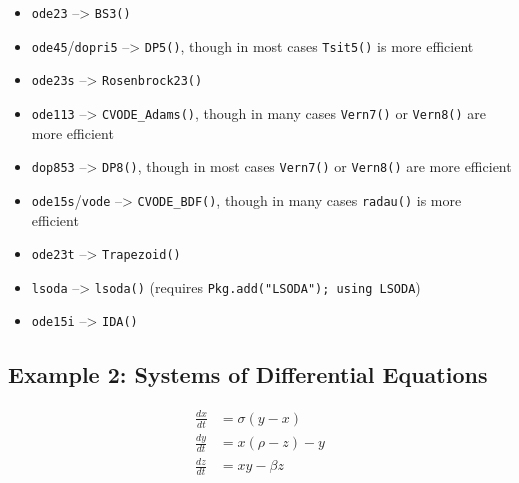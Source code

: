 \documentclass[11pt]{article}
\begin{document}
\begin{itemize}
\itemsep1pt\parskip0pt
\item
  \texttt{ode23} --\textgreater{} \texttt{BS3()}
\item
  \texttt{ode45}/\texttt{dopri5} --\textgreater{} \texttt{DP5()}, though
  in most cases \texttt{Tsit5()} is more efficient
\item
  \texttt{ode23s} --\textgreater{} \texttt{Rosenbrock23()}
\item
  \texttt{ode113} --\textgreater{} \texttt{CVODE\_Adams()}, though in
  many cases \texttt{Vern7()} or \texttt{Vern8()} are more efficient
\item
  \texttt{dop853} --\textgreater{} \texttt{DP8()}, though in most cases
  \texttt{Vern7()} or \texttt{Vern8()} are more efficient
\item
  \texttt{ode15s}/\texttt{vode} --\textgreater{} \texttt{CVODE\_BDF()},
  though in many cases \texttt{radau()} is more efficient
\item
  \texttt{ode23t} --\textgreater{} \texttt{Trapezoid()}
\item
  \texttt{lsoda} --\textgreater{} \texttt{lsoda()} (requires
  \texttt{Pkg.add("LSODA"); using LSODA})
\item
  \texttt{ode15i} --\textgreater{} \texttt{IDA()}
\end{itemize}

    \subsection{Example 2: Systems of Differential
Equations}\label{example-2-systems-of-differential-equations}

\[
\begin{align}
\frac{dx}{dt} &= σ(y-x) \\
\frac{dy}{dt} &= x(ρ-z) - y \\
\frac{dz}{dt} &= xy - βz \\
\end{align}
\]
\end{document}
